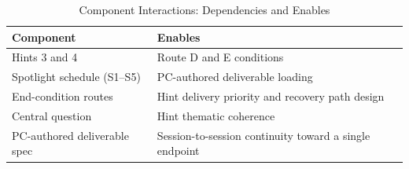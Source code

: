 \begin{table}[t]
\caption{Component Interactions: Dependencies and Enables}
\label{tab:component-interaction}
\begin{tabular}{@{}p{3.2cm}p{4.6cm}@{}}
\toprule
Component & Enables \\
\midrule
Hints 3 and 4 & Route D and E conditions \\
Spotlight schedule (S1--S5) & PC-authored deliverable loading \\
End-condition routes & Hint delivery priority and recovery path design \\
Central question & Hint thematic coherence \\
PC-authored deliverable spec & Session-to-session continuity toward a single endpoint \\
\bottomrule
\end{tabular}
\end{table}
